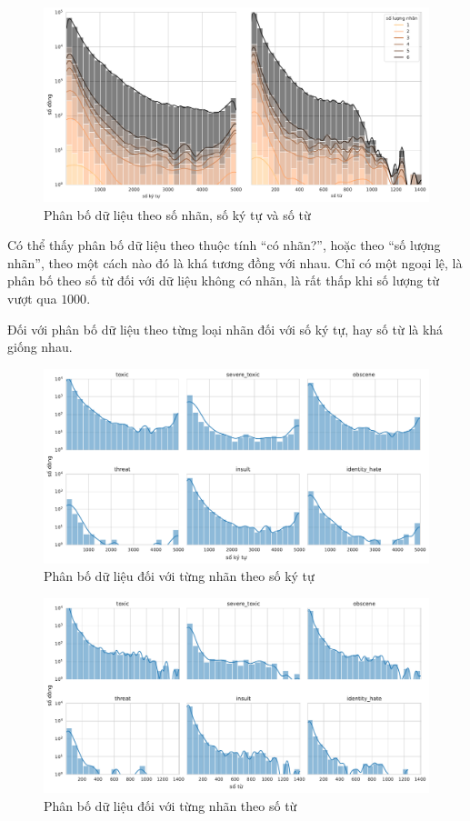 \begin{figure}[htb]
    \centering
    \includegraphics[width=\textwidth]{chapter_2/image/dist_num_chars_and_words_per_num_labels.pdf}
    \caption{Phân bố dữ liệu theo số nhãn, số ký tự và số từ}
\end{figure}

Có thể thấy phân bố dữ liệu theo thuộc tính ``có nhãn?'', hoặc theo ``số lượng nhãn'', theo một cách nào đó là khá tương đồng với nhau. Chỉ có một ngoại lệ, là phân bố theo số từ đối với dữ liệu không có nhãn, là rất thấp khi số lượng từ vượt qua $1000$.

Đối với phân bố dữ liệu theo từng loại nhãn đối với số ký tự, hay số từ là khá giống nhau.
\begin{figure}[htb]
    \centering
    \includegraphics[width=\textwidth]{chapter_2/image/dist_num_chars_per_label.pdf}
    \caption{Phân bố dữ liệu đối với từng nhãn theo số ký tự}
\end{figure}
\begin{figure}[htb]
    \centering
    \includegraphics[width=\textwidth]{chapter_2/image/dist_num_words_per_label.pdf}
    \caption{Phân bố dữ liệu đối với từng nhãn theo số từ}
\end{figure}

